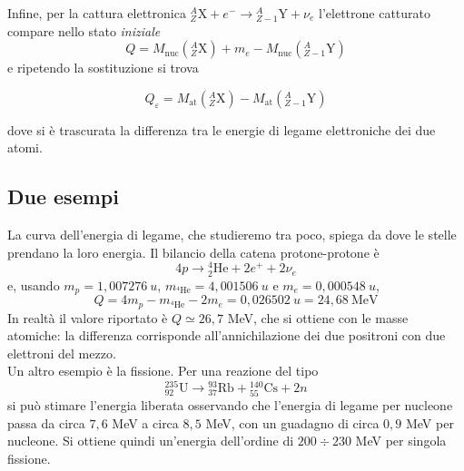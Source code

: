 Infine, per la cattura elettronica ${}^{A}_{Z}\mathrm{X} + e^- \to {}^{A}_{Z-1}\mathrm{Y} + \nu_e$ l'elettrone catturato compare nello stato \emph{iniziale}
%
\begin{equation}
    Q = M_{\text{nuc}}({}^{A}_{Z}\mathrm{X}) + m_e - M_{\text{nuc}}({}^{A}_{Z-1}\mathrm{Y})
\end{equation}
e ripetendo la sostituzione si trova
%
\begin{tcolorbox}[colback=black!5!white, colframe=black!45!white, boxrule=0.8pt]
\begin{equation}
    Q_{\varepsilon} = M_{\text{at}}({}^{A}_{Z}\mathrm{X}) - M_{\text{at}}({}^{A}_{Z-1}\mathrm{Y})
\end{equation}
\end{tcolorbox}
dove si è trascurata la differenza tra le energie di legame elettroniche dei due atomi.

\subsection{Due esempi}

La curva dell'energia di legame, che studieremo tra poco, spiega da dove le stelle prendano la loro energia. Il bilancio della catena protone-protone è
%
\begin{equation*}
    4 p \longrightarrow {}^{4}_{2}\mathrm{He} + 2 e^+ + 2 \nu_e
\end{equation*}
e, usando $m_p = 1,007276 \ u$, $m_{{}^4\mathrm{He}} = 4,001506 \ u$ e $m_{e} = 0,000548 \ u$,
%
\begin{equation}
    Q = 4 m_p - m_{{}^4\mathrm{He}} - 2 m_e = 0,026502 \ u = 24,68 \ \mathrm{MeV}
\end{equation}
In realtà il valore riportato è $Q \simeq 26,7$ MeV, che si ottiene con le masse atomiche: la differenza corrisponde all'annichilazione dei due positroni con due elettroni del mezzo.\\

Un altro esempio è la fissione. Per una reazione del tipo
%
\begin{equation*}
    {}^{235}_{92}\mathrm{U} \longrightarrow {}^{93}_{37}\mathrm{Rb} + {}^{140}_{55}\mathrm{Cs} + 2n
\end{equation*}
si può stimare l'energia liberata osservando che l'energia di legame per nucleone passa da circa $7,6$ MeV a circa $8,5$ MeV, con un guadagno di circa $0,9$ MeV per nucleone. Si ottiene quindi un'energia dell'ordine di $200 \div 230$ MeV per singola fissione. 


